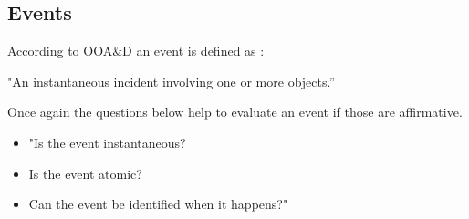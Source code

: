 \subsection{Events}

According to OOA\&D an event is defined as \citep[p.~53]{Rod-Aalborg}:

"An instantaneous incident involving one or more objects.''

Once again the questions below help to evaluate an event if those are affirmative\citep[p.~65]{Rod-Aalborg}.
\begin{itemize}
	\item "Is the event instantaneous?
	\item Is the event atomic?
	\item Can the event be identified when it happens?"
\end{itemize}

